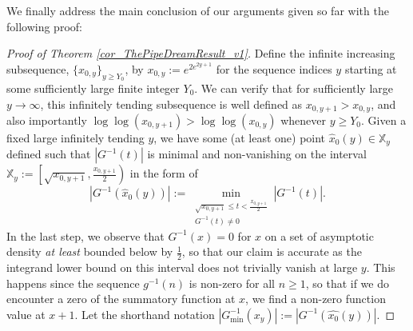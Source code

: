 \documentclass[11pt,reqno,a4letter]{article}
\numberwithin{figure}{section}
\numberwithin{table}{section}
\theoremstyle{plain}
\numberwithin{theorem}{section}
\theoremstyle{definition}
\begin{document}
We finally address the main conclusion of our arguments given so far with the 
following proof: 

\begin{proof}[Proof of Theorem \ref{cor_ThePipeDreamResult_v1}] 
\label{proofOf_cor_ThePipeDreamResult_v1} 
Define the infinite increasing subsequence, 
$\{x_{0,y}\}_{y \geq Y_0}$, by $x_{0,y} := e^{2e^{2y+1}}$ for the sequence indices $y$ 
starting at some sufficiently 
large finite integer $Y_0$. 
We can verify that for sufficiently large $y \rightarrow \infty$, this infinitely 
tending subsequence is well defined as $x_{0,y+1} > x_{0,y}$, and also importantly 
$\log\log(x_{0,y+1}) > \log\log(x_{0,y})$ whenever $y \geq Y_0$. 
Given a fixed large infinitely tending $y$, we have some (at least one) point 
$\widehat{x}_0(y) \in\mathbb{X}_y$ defined such that 
$|G^{-1}(t)|$ is minimal and non-vanishing on the interval 
$\mathbb{X}_y := \left[\sqrt{x_{0,y+1}}, \frac{x_{0,y+1}}{2}\right)$ 
in the form of 
\[
\left\lvert G^{-1}(\widehat{x}_0(y)) \right\rvert := 
     \min_{\substack{\sqrt{x_{0,y+1}} \leq t < \frac{x_{0,y+1}}{2} \\ G^{-1}(t) \neq 0}} 
     |G^{-1}(t)|. 
\] 
In the last step, we observe that $G^{-1}(x) = 0$ for $x$ on a set of 
asymptotic density \emph{at least} bounded below by $\frac{1}{2}$, so that our 
claim is accurate as the integrand lower bound on this interval 
does not trivially vanish at large $y$. This happens since the sequence 
$g^{-1}(n)$ is non-zero for all $n \geq 1$, so that if we do encounter a zero of the 
summatory function at $x$, we find a non-zero function value at $x+1$. 
Let the shorthand notation $|G_{\min}^{-1}(x_y)| := |G^{-1}(\hat{x_0}(y))|$. 


\end{proof}
\end{document}
